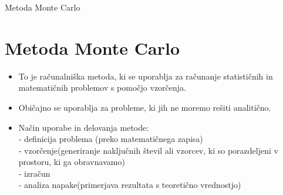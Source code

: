 \begin{frame}{Metoda Monte Carlo}

\section{Metoda Monte Carlo}

\begin{itemize}
    \item To je računalniška metoda, ki se uporablja za računanje statističnih in matematičnih problemov s pomočjo vzorčenja.\\
    \pause
    
    \item Običajno se uporablja za probleme, ki jih ne moremo rešiti analitično.\\
    \pause
    
    \item Način uporabe in delovanja metode:\\
    
    - definicija problema (preko matematičnega zapisa)\\
    
    - vzorčenje(generiranje naključnih števil ali vzorcev, ki so porazdeljeni v prostoru, ki ga obravnavamo)\\
    
    - izračun\\
    
    - analiza napake(primerjava rezultata s teoretično vrednostjo)
    
\end{itemize}

\end{frame}